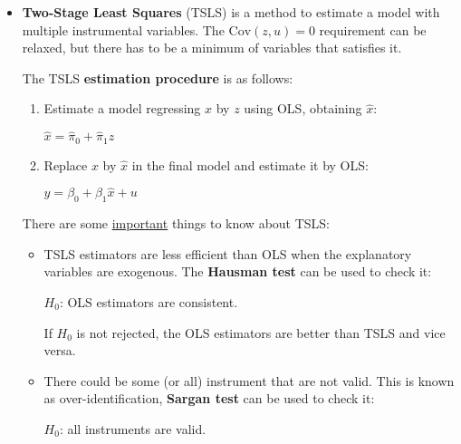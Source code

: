 \documentclass[10pt, a4paper, landscape]{article}
\newcommand{\Cov}{\mathrm{Cov}}
\begin{document}
\begin{multicols}{3}
		\begin{itemize}[leftmargin=*]
			\item \textbf{Two-Stage Least Squares} (TSLS) is a method to estimate a model with multiple instrumental variables. The $\Cov(z, u) = 0$ requirement can be relaxed, but there has to be a minimum of variables that satisfies it.
			
			The TSLS \textbf{estimation procedure} is as follows:
			
			\begin{enumerate}[leftmargin=*]
				\item Estimate a model regressing $x$ by $z$ using OLS, obtaining $\hat{x}$:
				
				\begin{center}
					$\hat{x} = \hat{\pi}_{0} + \hat{\pi}_{1} z$
				\end{center}
				
				\item Replace $x$ by $\hat{x}$ in the final model and estimate it by OLS:
				
				\begin{center}
					$y = \beta_{0} + \beta_{1} \hat{x}+ u$
				\end{center}
			\end{enumerate}
			
			There are some \underline{important} things to know about TSLS:
			
			\begin{itemize}[leftmargin=*]
				\item TSLS estimators are less efficient than OLS when the explanatory variables are exogenous. The \textbf{Hausman test} can be used to check it:
				
				\begin{center}
					$H_{0}$: OLS estimators are consistent.
				\end{center}
				
				If $H_{0}$ is not rejected, the OLS estimators are better than TSLS and vice versa.
				
				\item There could be some (or all) instrument that are not valid. This is known as over-identification, \textbf{Sargan test} can be used to check it:
				
				\begin{center}
					$H_{0}$: all instruments are valid.
				\end{center}
			\end{itemize}
		\end{itemize}
		

\end{multicols}
\end{document}
